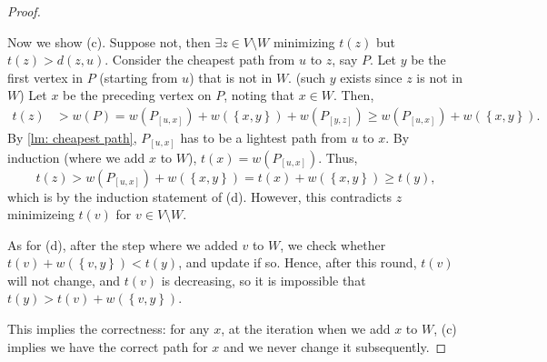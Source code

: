 \begin{proof}
\begin{explanation}
\begin{itemize}
            Now we show (c). Suppose not, then \(\exists z \in V\setminus W\) minimizing \(t(z)\) but \(t(z) > d(z, u)\). Consider the cheapest path from \(u\) to \(z\), say \(P\). Let \(y\) be the first vertex in \(P\) (starting from \(u\)) that is not in \(W\). (such \(y\) exists since \(z\) is not in \(W\)) Let \(x\) be the preceding vertex on \(P\), noting that \(x \in W\). Then, 
            \begin{align*}
                t(z) &> w(P) = w(P_{[u, x]}) + w(\left\{ x,y \right\} ) + w(P_{[y, z]}) \ge w(P_{[u, x]}) + w(\left\{ x, y \right\}).
            \end{align*}                        
            By \autoref{lm: cheapest path}, \(P_{[u, x]}\) has to be a lightest path from \(u\) to \(x\). By induction (where we add \(x\) to \(W\)), \(t(x) = w(P_{[u, x]})\). Thus,
            \[
                t(z) > w(P_{[u,x]}) + w(\left\{ x,y \right\} ) = t(x) + w(\left\{ x, y \right\}) \ge t(y),
            \]   
            which is by the induction statement of (d). However, this contradicts \(z\) minimizeing \(t(v)\) for \(v \in V\setminus W\). 
            
            As for (d), after the step where we added \(v\) to \(W\), we check whether \(t(v) + w(\left\{ v, y \right\} ) < t(y)\), and update if so. Hence, after this round, \(t(v)\) will not change, and \(t(v)\) is decreasing, so it is impossible that \(t(y) > t(v) + w(\left\{ v, y \right\} )\).      
        \end{itemize}
    \end{explanation}

    This implies the correctness: for any \(x\), at the iteration when we add \(x\) to \(W\), (c) implies we have the correct path for \(x\) and we never change it subsequently.    
\end{proof}
